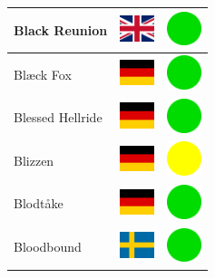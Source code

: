 \documentclass[12pt, a4paper, twoside]{report}
\begin{document}
\begin{center}
\begin{longtable}{|p{5cm}|p{2cm}|p{2cm}|}
Black Reunion & \includegraphics[width=1cm]{4x3/gb} & \includegraphics[width=1cm]{likes/y} \\ \hline
Blæck Fox & \includegraphics[width=1cm]{4x3/de} & \includegraphics[width=1cm]{likes/y} \\ \hline
Blessed Hellride & \includegraphics[width=1cm]{4x3/de} & \includegraphics[width=1cm]{likes/y} \\ \hline
Blizzen & \includegraphics[width=1cm]{4x3/de} & \includegraphics[width=1cm]{likes/m} \\ \hline
Blodtåke & \includegraphics[width=1cm]{4x3/de} & \includegraphics[width=1cm]{likes/y} \\ \hline
Bloodbound & \includegraphics[width=1cm]{4x3/se} & \includegraphics[width=1cm]{likes/y} \\ \hline

\end{longtable}
\end{center}
\end{document}
